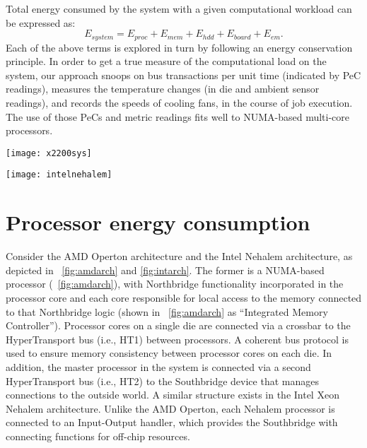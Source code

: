 Total energy consumed by the system with a given computational workload
can be expressed as:
\begin{equation}
\label{eq:linmodel}
E_{system}= E_{proc} + E_{mem} + E_{hdd}+ E_{board} +  E_{em}.
\end{equation}
Each of the above terms is explored in turn by following an energy
conservation principle.  In order to get a true measure of the
computational load on the system, our approach snoops on bus
transactions per unit time (indicated by PeC readings), measures the
temperature changes (in die and ambient sensor readings), and records
the speeds of cooling fans, in the course of job execution.  The use of
those PeCs and metric readings fits well to NUMA-based multi-core
processors.
\begin{figure*}[tp]
  \begin{minipage}{0.5\linewidth}
  \centering
     \texttt{[image: x2200sys]}
     \caption{AMD Opteron architecture.}
     \label{fig:amdarch}
  \end{minipage}\hspace{0.1cm}
  \begin{minipage}{0.5\linewidth}
  \centering
     \texttt{[image: intelnehalem]}
     \caption{Intel Xeon (Nehalem) architecture.}
     \label{fig:intarch}
  \end{minipage}
\end{figure*}
\section{Processor energy consumption}
\label{sec:procmodel}
Consider the AMD Operton architecture and the Intel Nehalem
architecture, as depicted in \figurenames~\ref{fig:amdarch} and
\ref{fig:intarch}.  The former is a NUMA-based processor
(\figurename~\ref{fig:amdarch}), with Northbridge functionality
incorporated in the processor core and each core responsible for local
access to the memory connected to that Northbridge logic (shown in
\figurename~\ref{fig:amdarch} as ``Integrated Memory Controller'').
Processor cores on a single die are connected via a crossbar to the
HyperTransport bus (i.e., HT1) between processors.  A coherent bus
protocol is used to ensure memory consistency between processor cores on
each die.  In addition, the master processor in the system is connected
via a second HyperTransport bus (i.e., HT2) to the Southbridge device
that manages connections to the outside world.  A similar structure
exists in the Intel Xeon Nehalem architecture.  Unlike the AMD Operton,
each Nehalem processor is connected to an Input-Output handler, which
provides the Southbridge with connecting functions for off-chip resources.

